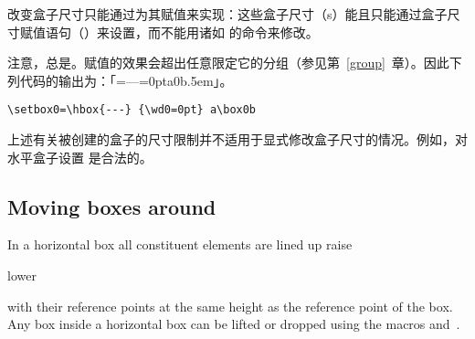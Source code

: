\documentclass{book}
\begin{document}
改变盒子尺寸只能通过为其赋值来实现：这些盒子尺寸（s）能且只能通过盒子尺寸赋值语句（）来设置，而不能用诸如  的命令来修改。

注意，总是。赋值的效果会超出任意限定它的分组（参见第~\ref{group}~章）。因此下列代码的输出为：「{=\hbox{---}{=0pt}a\box0b}\kern.5em」。
\begin{verbatim}
\setbox0=\hbox{---} {\wd0=0pt} a\box0b
\end{verbatim}

上述有关被创建的盒子的尺寸限制并不适用于显式修改盒子尺寸的情况。例如，对水平盒子设置  是合法的。

\subsection{Moving boxes around}

In a horizontal box all constituent elements are lined up
\cstoidx raise\par\cstoidx lower\par
with their reference points at the same height as the
reference point of the box. Any box inside a horizontal
box can be lifted or dropped using the macros
 and~.
\end{document}
